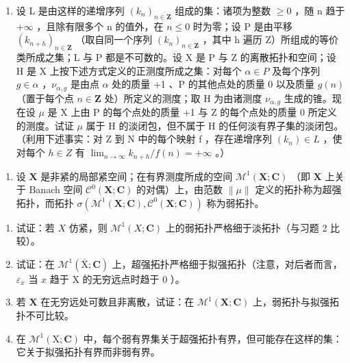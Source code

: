 \begin{enumerate}
\def\labelenumi{\alph{enumi})}
\setcounter{enumi}{1}
\tightlist
\item
  设 L 是由这样的递增序列 \((k_{n})_{n\in\mathbf{Z}}\) 组成的集：诸项为整数 \(\geqslant0\) ，随 n 趋于 \(+\infty\) ，且除有限多个 n 的值外，在 \(n\leqslant0\) 时为零；设 P 是由平移 \((k_{n+h})_{n\in\mathbf{Z}}\) （取自同一个序列 \((k_{n})_{n\in\mathbf{Z}}\) ，其中 h 遍历 Z）所组成的等价类所成之集；L 与 P 都是不可数的。设 X 是 P 与 Z 的离散拓扑和空间；设 H 是 X 上按下述方式定义的正测度所成之集：对每个 \(\alpha\in P\) 及每个序列 \(g\in\alpha\) ，\(\nu_{\alpha,g}\) 是由点 \(\alpha\) 处的质量 +1 、P 的其他点处的质量 0 以及质量 \(g(n)\) （置于每个点 \(n\in\mathbf{Z}\) 处）所定义的测度；取 H 为由诸测度 \(\nu_{\alpha,g}\) 生成的锥。现在设 \(\mu\) 是 X 上由 P 的每个点处的质量 +1 与 Z 的每个点处的质量 0 所定义的测度。试证 \(\mu\) 属于 H 的淡闭包，但不属于 H 的任何淡有界子集的淡闭包。（利用下述事实：对 Z 到 N 中的每个映射 f ，存在递增序列 \((k_{n})\in L\) ，使对每个 \(h\in Z\) 有 \(\lim_{n\to\infty}k_{n+h}/f(n)=+\infty\) 。）
\end{enumerate}

\begin{enumerate}
\def\labelenumi{\arabic{enumi})}
\setcounter{enumi}{14}
\tightlist
\item
  设 \(\mathbf{X}\) 是非紧的局部紧空间；在有界测度所成的空间 \(\mathcal{M}^1(\mathbf{X};\mathbf{C})\) （即 \(\mathbf{X}\) 上关于 Banach 空间 \(\mathcal{C}^0(\mathbf{X};\mathbf{C})\) 的对偶）上，由范数 \(\| \mu \|\) 定义的拓扑称为超强拓扑，而拓扑 \(\sigma (\mathcal{M}^1(\mathbf{X};\mathbf{C}),\mathcal{C}^0(\mathbf{X};\mathbf{C}))\) 称为弱拓扑。
\end{enumerate}

\begin{enumerate}
\def\labelenumi{\alph{enumi})}
\item
  试证：若 \(X\) 仿紧，则 \(\mathcal{M}^1(X; \mathbf{C})\) 上的弱拓扑严格细于淡拓扑（与习题 2 比较）。
\item
  试证：在 \(\mathcal{M}^1 (\overline{\mathrm{X}};\mathbf{C})\) 上，超强拓扑严格细于拟强拓扑（注意，对后者而言，\(\varepsilon_{x}\) 当 \(x\) 趋于 X 的无穷远点时趋于 0 ）。
\item
  若 \(\mathbf{X}\) 在无穷远处可数且非离散，试证：在 \(\mathcal{M}^1(\mathbf{X};\mathbf{C})\) 上，弱拓扑与拟强拓扑不可比较。
\item
  在 \(\mathcal{M}^1 (\mathrm{X};\mathbf{C})\) 中，每个弱有界集关于超强拓扑有界，但可能存在这样的集：它关于拟强拓扑有界而非弱有界。
\end{enumerate}

